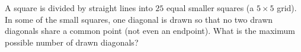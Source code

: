 A square is divided by straight lines into $25$ equal smaller squares (a $5\times5$ grid). In some of the small squares, one diagonal is drawn so that no two drawn diagonals share a common point (not even an endpoint). What is the maximum possible number of drawn diagonals?
